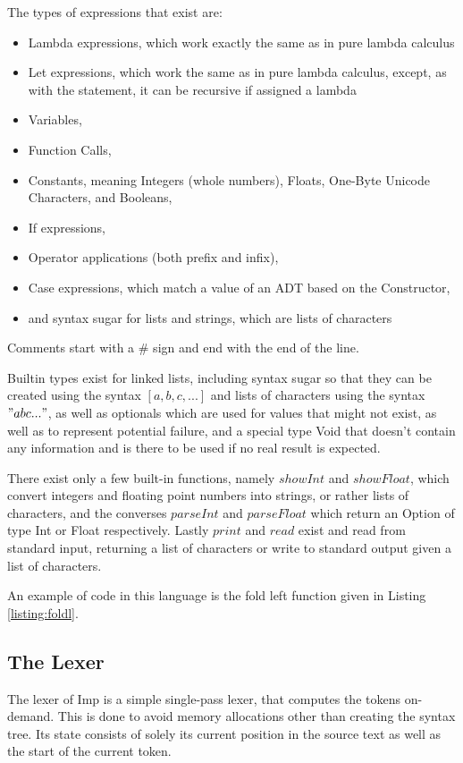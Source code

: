 \documentclass[12pt]{article}
\newcommand{\importListing}[1]{
    \begin{minipage}{\linewidth}
    
    \end{minipage}
}
\begin{document}
The types of expressions that exist are:
\begin{itemize}
	\item Lambda expressions, which work exactly
	      the same as in pure lambda calculus
	\item Let expressions, which work the same as in pure
	      lambda calculus, except, as with the statement,
	      it can be recursive if assigned a lambda
	\item Variables,
	\item Function Calls,
	\item Constants, meaning Integers (whole numbers), Floats,
	      One-Byte Unicode Characters, and Booleans,
	\item If expressions,
	\item Operator applications (both prefix and infix),
	\item Case expressions, which match a value of an ADT
	      based on the Constructor,
	\item and syntax sugar for lists and strings,
	      which are lists of characters
\end{itemize}

Comments start with a $\#$ sign and end with the end of the line.

Builtin types exist for linked lists, including syntax sugar so that
they can be created using the syntax $[a, b, c, ...]$ and lists of characters
using the syntax $"abc..."$, as well as optionals which are used for
values that might not exist, as well as to represent potential failure,
and a special type Void that doesn't contain any information and is there to
be used if no real result is expected.

There exist only a few built-in functions, namely
$showInt$ and $showFloat$, which convert integers and floating point numbers
into strings, or rather lists of characters, and the converses $parseInt$ and
$parseFloat$ which return an Option of type Int or Float respectively.
Lastly $print$ and $read$ exist and read from standard input, returning a list
of characters or write to standard output given a list of characters.

\importListing{code/foldl.tex}

An example of code in this language is the fold left function
given in Listing \ref{listing:foldl}.

\subsection{The Lexer}
The lexer of Imp is a simple single-pass lexer, that computes
the tokens on-demand. This is done to avoid memory
allocations other than creating the syntax tree.
Its state consists of solely its
current position in the source text as well as the start
of the current token.
\end{document}
